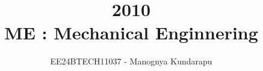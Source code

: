 \documentclass[journal]{IEEEtran}
\begin{document}

\vspace{3cm}

\title{2010\\ME : Mechanical Enginnering}
\author{EE24BTECH11037 - Manognya Kundarapu
}
{\let\newpage\relax\maketitle}

\renewcommand{\thefigure}{\theenumi}
\renewcommand{\thetable}{\theenumi}
\setlength{\intextsep}{10pt} %


\renewcommand{\thetable}{\theenumi}
\end{document}
